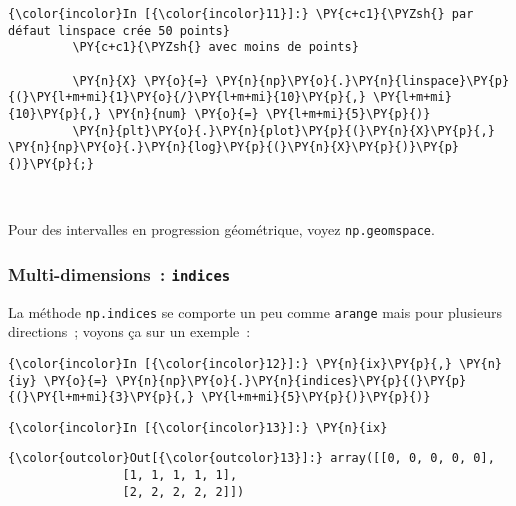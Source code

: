     \begin{Verbatim}[commandchars=\\\{\}]
{\color{incolor}In [{\color{incolor}11}]:} \PY{c+c1}{\PYZsh{} par défaut linspace crée 50 points}
         \PY{c+c1}{\PYZsh{} avec moins de points}
         
         \PY{n}{X} \PY{o}{=} \PY{n}{np}\PY{o}{.}\PY{n}{linspace}\PY{p}{(}\PY{l+m+mi}{1}\PY{o}{/}\PY{l+m+mi}{10}\PY{p}{,} \PY{l+m+mi}{10}\PY{p}{,} \PY{n}{num} \PY{o}{=} \PY{l+m+mi}{5}\PY{p}{)}
         \PY{n}{plt}\PY{o}{.}\PY{n}{plot}\PY{p}{(}\PY{n}{X}\PY{p}{,} \PY{n}{np}\PY{o}{.}\PY{n}{log}\PY{p}{(}\PY{n}{X}\PY{p}{)}\PY{p}{)}\PY{p}{;}
\end{Verbatim}


    \begin{center}
    \end{center}
    { \hspace*{\fill} \\}
    
    Pour des intervalles en progression géométrique, voyez
\texttt{np.geomspace}.

    \hypertarget{multi-dimensions-indices}{%
\subsubsection{\texorpdfstring{Multi-dimensions~:
\texttt{indices}}{Multi-dimensions~: indices}}\label{multi-dimensions-indices}}

    La méthode \texttt{np.indices} se comporte un peu comme \texttt{arange}
mais pour plusieurs directions~; voyons ça sur un exemple~:

    \begin{Verbatim}[commandchars=\\\{\}]
{\color{incolor}In [{\color{incolor}12}]:} \PY{n}{ix}\PY{p}{,} \PY{n}{iy} \PY{o}{=} \PY{n}{np}\PY{o}{.}\PY{n}{indices}\PY{p}{(}\PY{p}{(}\PY{l+m+mi}{3}\PY{p}{,} \PY{l+m+mi}{5}\PY{p}{)}\PY{p}{)}
\end{Verbatim}


    \begin{Verbatim}[commandchars=\\\{\}]
{\color{incolor}In [{\color{incolor}13}]:} \PY{n}{ix}
\end{Verbatim}


\begin{Verbatim}[commandchars=\\\{\}]
{\color{outcolor}Out[{\color{outcolor}13}]:} array([[0, 0, 0, 0, 0],
                [1, 1, 1, 1, 1],
                [2, 2, 2, 2, 2]])
\end{Verbatim}
            
